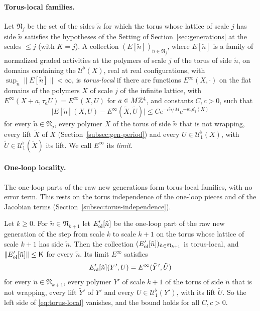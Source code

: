 \paragraph{Torus-local families.} Let $\mathfrak N_j$ be the set of the sides $\tilde n$ for which the torus whose lattice of scale $j$ has side $\tilde n$ satisfies the hypotheses of the Setting of Section~\ref{sec:generations} at the scales $\le j$ (with $K=j$). A collection $(E[\tilde n])_{\tilde n\in\mathfrak N_j}$, where $E[\tilde n]$ is a family of normalized graded activities at the polymers of scale $j$ of the torus of side $\tilde n$, on domains containing the $\mathcal U^\flat(X)$, real at real configurations, with $\sup_{\tilde n}\|E[\tilde n]\|<\infty$, is \emph{torus-local} if there are functions $E^\infty(X,\cdot)$ on the flat domains of the polymers $X$ of scale $j$ of the infinite lattice, with $E^\infty(X+a,\tau_aU)=E^\infty(X,U)$ for $a\in M\mathbb Z^4$, and constants $C,c>0$, such that
\begin{equation}\label{eq:torus-local}
\big|E[\tilde n](X,U)-E^\infty(\tilde X,\tilde U)\big|\le Ce^{-c\tilde n/M}e^{-\kappa_nd_j(X)}
\end{equation}
for every $\tilde n\in\mathfrak N_j$, every polymer $X$ of the torus of side $\tilde n$ that is not wrapping, every lift $\tilde X$ of $X$ (Section~\ref{subsec:gen-period}) and every $U\in\mathcal U^\flat_1(X)$, with $\tilde U\in\mathcal U^\flat_1(\tilde X)$ its lift. We call $E^\infty$ its \emph{limit}.

\paragraph{One-loop locality.} The one-loop parts of the raw new generations form torus-local families, with no error term. This rests on the torus independence of the one-loop pieces and of the Jacobian terms (Section~\ref{subsec:torus-independence}).

\begin{lemma}\label{lem:OL}
Let $k\ge0$. For $\tilde n\in\mathfrak N_{k+1}$ let $E'_{\rm ol}[\tilde n]$ be the one-loop part of the raw new generation of the step from scale $k$ to scale $k+1$ on the torus whose lattice of scale $k+1$ has side $\tilde n$. Then the collection $(E'_{\rm ol}[\tilde n])_{\tilde n\in\mathfrak N_{k+1}}$ is torus-local, and $\|E'_{\rm ol}[\tilde n]\|\le\mathsf K$ for every $\tilde n$. Its limit $E^\infty$ satisfies
\[
E'_{\rm ol}[\tilde n](Y',U)=E^\infty(\tilde Y',\tilde U)
\]
for every $\tilde n\in\mathfrak N_{k+1}$, every polymer $Y'$ of scale $k+1$ of the torus of side $\tilde n$ that is not wrapping, every lift $\tilde Y'$ of $Y'$ and every $U\in\mathcal U^\flat_1(Y')$, with its lift $\tilde U$. So the left side of \eqref{eq:torus-local} vanishes, and the bound holds for all $C,c>0$.
\end{lemma}

